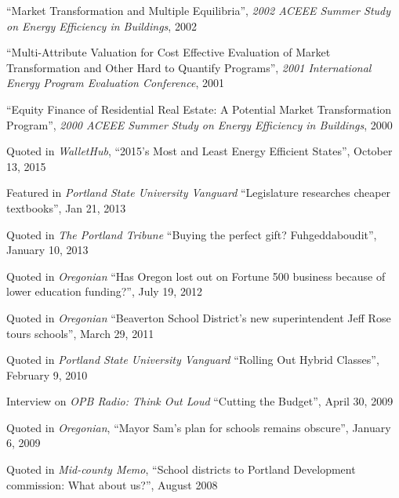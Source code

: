 \documentclass[Computer Science]{vita}
\begin{document}
\begin{vita}
\begin{Presentations and Invited Talks}
  \item ``Market Transformation and Multiple Equilibria'', \emph{2002
      ACEEE Summer Study on Energy Efficiency in Buildings}, 2002
	
  \item ``Multi-Attribute Valuation for Cost Effective Evaluation of
    Market Transformation and Other Hard to Quantify Programs'',
    \emph{2001 International Energy Program Evaluation Conference},
    2001
	
  \item ``Equity Finance of Residential Real Estate: A Potential
    Market Transformation Program'', \emph{2000 ACEEE Summer Study on
      Energy Efficiency in Buildings}, 2000

  \end{Presentations and Invited Talks}



  \begin{Media Outreach}
  \item Quoted in \emph{WalletHub}, ``2015’s Most and Least Energy Efficient States'', October 13, 2015
  

  \item Featured in \emph{Portland State University Vanguard} ``Legislature researches cheaper textbooks'', Jan 21, 2013
  
  \item Quoted in \emph{The Portland Tribune} ``Buying the perfect gift? Fuhgeddaboudit'', January 10, 2013
  
\item Quoted in \emph{Oregonian} ``Has Oregon lost out on Fortune 500 business because of lower education funding?'', July 19, 2012

\item Quoted in \emph{Oregonian} ``Beaverton School District's new superintendent Jeff Rose tours schools'', March 29, 2011
  
  \item Quoted in \emph{Portland State University Vanguard} ``Rolling Out Hybrid Classes'', February 9, 2010
  
  \item Interview on \emph{OPB Radio: Think Out Loud} ``Cutting the
    Budget'', April 30, 2009

  \item Quoted in \emph{Oregonian}, ``Mayor Sam's plan for schools
    remains obscure'', January 6, 2009

  \item Quoted in \emph{Mid-county Memo}, ``School districts to
    Portland Development commission: What about us?'', August 2008


\end{Media Outreach}
\end{vita}
\end{document}
